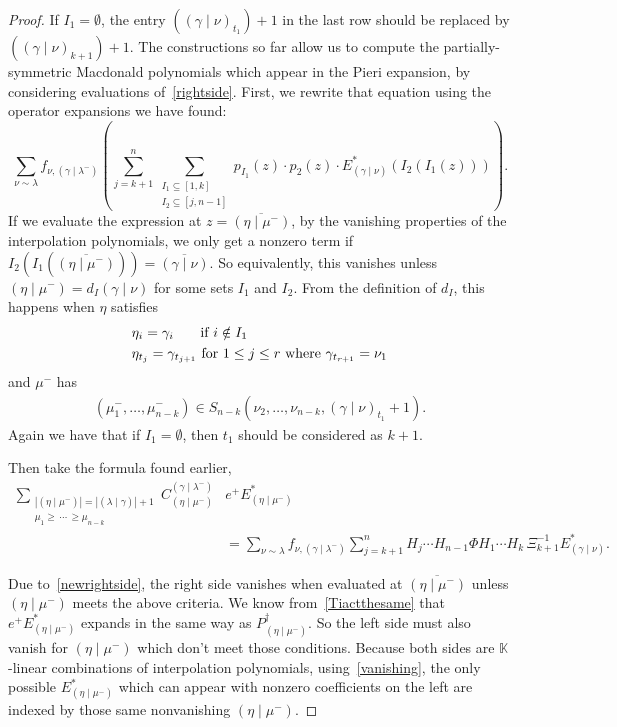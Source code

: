 \documentclass[ALCO]{cedram}
\newcommand{\K}{\mathbb{K}}
\newcommand{\Estar}[1]{E^*_{#1}}
\newcommand{\PB}[1]{P_{#1}^\dagger}
\newcommand{\nudom}{{( \lambda \mid \gamma )}}
\newcommand{\lambdagamma}{{\nudom}}
\newcommand{\gammalambdamin}{{(\gamma \mid \lambda^-)}}
\newcommand{\gammanu}{{(\gamma \mid \nu)}}
\newcommand{\etamu}{{(\eta \mid \mu^-)}}
\newcommand{\fnu}{f_{\nu, \gammalambdamin}}
\begin{document}
\begin{proof}
If $I_1 = \emptyset$, the entry $(\gammanu_{t_1})+1$ in the last row should be replaced by \mbox{$(\gammanu_{k+1})+1$}. The constructions so far allow us to compute the partially-symmetric Macdonald polynomials which appear in the Pieri expansion, by considering evaluations of~\eqref{rightside}. First, we rewrite that equation using the operator expansions we have found:
\begin{equation}\label{newrightside}
    \sum_{\nu \sim \lambda} \fnu\left( \sum_{j=k+1}^n    \sum\limits_{\substack{I_1 \subseteq [1,k] \\ I_2 \subseteq [j, n-1]}} p_{I_1}(z) \cdot p_2(z)  \cdot \Estar{\gammanu}(I_2(I_1(z))) \right).
\end{equation} If we evaluate the expression at $z=\overline{\etamu}$, by the vanishing properties of the interpolation polynomials, we only get a nonzero term if $I_2\left( I_1 \left( \overline{\etamu} \right) \right) = \overline{\gammanu}$. So equivalently, this vanishes unless $\etamu = d_I\gammanu$ for some sets $I_1$ and $I_2$. From the definition of $d_I$, this happens when $\eta$ satisfies
\begin{align}
    &\eta_i = \gamma_i \hspace*{.55cm}\text{ if } i\notin I_1 \label{part1}\\
    &\eta_{t_j}=\gamma_{t_{j+1}} \text{ for } 1\leq j \leq r \text{ where } \gamma_{t_{r+1}} = \nu_1\label{part2}
\end{align}
and $\mu^-$ has
\begin{align}
    (\mu_1^-, \dotsc, \mu_{n-k}^- ) \in S_{n-k} (\nu_2, \dotsc, \nu_{n-k}, \gammanu_{t_1}+1).\label{part3}
\end{align}
Again we have that if $I_1 = \emptyset$, then $t_1$ should be considered as $k+1$. 

Then take the formula found earlier,
\begin{align*}   \sum_{\substack{|\etamu| = |\lambdagamma| + 1 \\ \mu_1 \geq \, \dotsm \, \geq \mu_{n-k}}}  C^{\gammalambdamin}_{\etamu} &e^+ \Estar{\etamu}  \\ &=  \sum_{\nu \sim \lambda} \fnu  \sum_{j=k+1}^n  H_j \dotsm H_{n-1} \Phi H_1 \dotsm H_{k} \, \Xi_{k+1}^{-1}  \Estar{\gammanu}.\end{align*}

Due to~\eqref{newrightside}, the right side vanishes when evaluated at $\overline{\etamu}$ unless $\etamu$ meets the above criteria. We know from~\eqref{Tiactthesame} that $e^+ \Estar{\etamu}$ expands in the same way as $ \PB{\etamu}$. So the left side must also vanish for $\etamu$ which don't meet those conditions. Because both sides are $\K$-linear combinations of interpolation polynomials,  using~\eqref{vanishing}, the only possible $\Estar{\etamu}$ which can appear with nonzero coefficients on the left are indexed by those same nonvanishing $\etamu$.


\end{proof}
\end{document}
